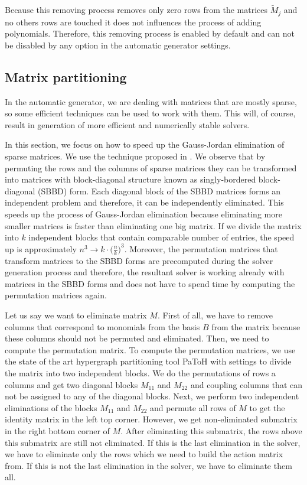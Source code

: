 

Because this removing process removes only zero rows from the matrices $\tilde{M}_j$ and no others rows are touched it does not influences the process of adding polynomials. Therefore, this removing process is enabled by default and can not be disabled by any option in the automatic generator settings.

\subsection{Matrix partitioning}
\label{subsec:matrixPart}
In the automatic generator, we are dealing with matrices that are mostly sparse, so some efficient techniques can be used to work with them. This will, of course, result in generation of more efficient and numerically stable solvers.

In this section, we focus on how to speed up the Gauss-Jordan elimination of sparse matrices. We use the technique proposed in \cite{SBBD}. We observe that by permuting the rows and the columns of sparse matrices they can be transformed into matrices with block-diagonal structure known as singly-bordered block-diagonal (SBBD) form. Each diagonal block of the SBBD matrices forms an independent problem and therefore, it can be independently eliminated. This speeds up the process of Gauss-Jordan elimination because eliminating more smaller matrices is faster than eliminating one big matrix. If we divide the matrix into $k$ independent blocks that contain comparable number of entries, the speed up is approximately $n^3 \rightarrow k\cdot\big(\frac{n}{k}\big)^3$. Moreover, the permutation matrices that transform matrices to the SBBD forms are precomputed during the solver generation process and therefore, the resultant solver is working already with matrices in the SBBD forms and does not have to spend time by computing the permutation matrices again.

Let us say we want to eliminate matrix $M$. First of all, we have to remove columns that correspond to monomials from the basis $B$ from the matrix because these columns should not be permuted and eliminated. Then, we need to compute the permutation matrix. To compute the permutation matrices, we use the state of the art hypergraph partitioning tool PaToH \cite{PaToH} with settings to divide the matrix into two independent blocks. We do the permutations of rows a columns and get two diagonal blocks $M_{11}$ and $M_{22}$ and coupling columns that can not be assigned to any of the diagonal blocks. Next, we perform two independent eliminations of the blocks $M_{11}$ and $M_{22}$ and permute all rows of $M$ to get the identity matrix in the left top corner. However, we get non-eliminated submatrix in the right bottom corner of $M$. After eliminating this submatrix, the rows above this submatrix are still not eliminated. If this is the last elimination in the solver, we have to eliminate only the rows which we need to build the action matrix from. If this is not the last elimination in the solver, we have to eliminate them all.

